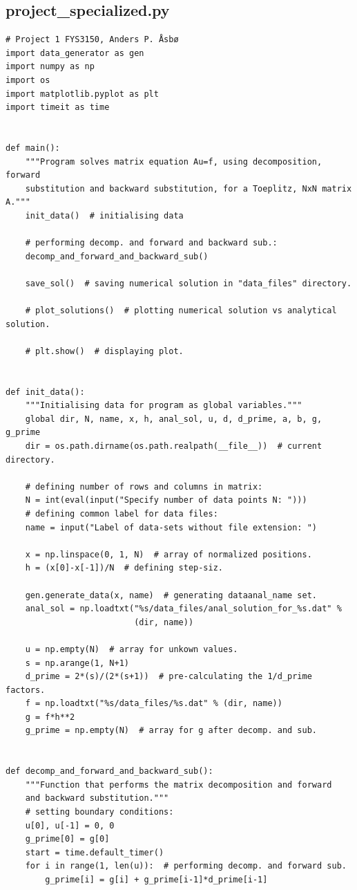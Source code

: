 \documentclass[english,notitlepage,reprint]{revtex4-1}  %
\begin{document}
\subsection{project\_specialized.py}\label{A:2}
\begin{lstlisting}
# Project 1 FYS3150, Anders P. Åsbø
import data_generator as gen
import numpy as np
import os
import matplotlib.pyplot as plt
import timeit as time


def main():
    """Program solves matrix equation Au=f, using decomposition, forward
    substitution and backward substitution, for a Toeplitz, NxN matrix A."""
    init_data()  # initialising data

    # performing decomp. and forward and backward sub.:
    decomp_and_forward_and_backward_sub()

    save_sol()  # saving numerical solution in "data_files" directory.

    # plot_solutions()  # plotting numerical solution vs analytical solution.

    # plt.show()  # displaying plot.


def init_data():
    """Initialising data for program as global variables."""
    global dir, N, name, x, h, anal_sol, u, d, d_prime, a, b, g, g_prime
    dir = os.path.dirname(os.path.realpath(__file__))  # current directory.

    # defining number of rows and columns in matrix:
    N = int(eval(input("Specify number of data points N: ")))
    # defining common label for data files:
    name = input("Label of data-sets without file extension: ")

    x = np.linspace(0, 1, N)  # array of normalized positions.
    h = (x[0]-x[-1])/N  # defining step-siz.

    gen.generate_data(x, name)  # generating dataanal_name set.
    anal_sol = np.loadtxt("%s/data_files/anal_solution_for_%s.dat" %
                          (dir, name))

    u = np.empty(N)  # array for unkown values.
    s = np.arange(1, N+1)
    d_prime = 2*(s)/(2*(s+1))  # pre-calculating the 1/d_prime factors.
    f = np.loadtxt("%s/data_files/%s.dat" % (dir, name))
    g = f*h**2
    g_prime = np.empty(N)  # array for g after decomp. and sub.


def decomp_and_forward_and_backward_sub():
    """Function that performs the matrix decomposition and forward
    and backward substitution."""
    # setting boundary conditions:
    u[0], u[-1] = 0, 0
    g_prime[0] = g[0]
    start = time.default_timer()
    for i in range(1, len(u)):  # performing decomp. and forward sub.
        g_prime[i] = g[i] + g_prime[i-1]*d_prime[i-1]


\end{lstlisting}
\end{document}

